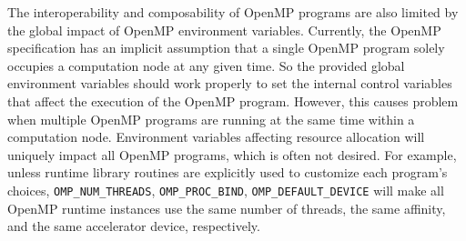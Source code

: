 The interoperability and composability of OpenMP programs are also limited by the global impact of OpenMP environment variables.
Currently, the OpenMP specification has an implicit assumption that a single OpenMP program solely occupies a computation node at any given time.
So the provided global environment variables should work properly to set the internal control variables that affect the execution
of the OpenMP program. 
However, this causes problem when multiple OpenMP programs are running at the same time within a computation node. 
Environment variables affecting resource allocation will uniquely impact all OpenMP programs, which is often not desired.
For example, unless runtime library routines are explicitly used to customize each program's choices, \lstinline{OMP_NUM_THREADS}, \lstinline{OMP_PROC_BIND}, \lstinline{OMP_DEFAULT_DEVICE} will
make all OpenMP runtime instances use the same number of threads, the same affinity, and the same accelerator device, respectively. 

